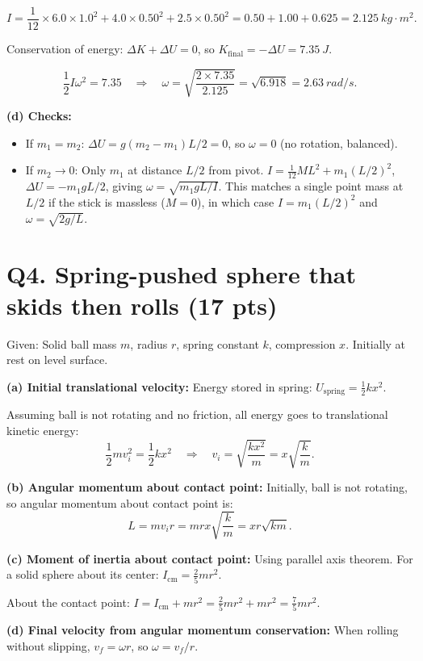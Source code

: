\documentclass[11pt]{article}
\newcommand{\ans}[1]{\boxed{\displaystyle #1}}
\begin{document}
\[ I = \frac{1}{12} \times 6.0 \times 1.0^2 + 4.0 \times 0.50^2 + 2.5 \times 0.50^2 = 0.50 + 1.00 + 0.625 = \SI{2.125}{kg\cdot m^2}. \]

Conservation of energy: $\Delta K + \Delta U = 0$, so $K_{\text{final}} = -\Delta U = \SI{7.35}{J}$.

\[ \frac{1}{2}I\omega^2 = 7.35 \quad\Rightarrow\quad \omega = \sqrt{\frac{2 \times 7.35}{2.125}} = \sqrt{6.918} = \ans{\SI{2.63}{rad/s}}. \]

\textbf{(d) Checks:}
\begin{itemize}
  \item If $m_1 = m_2$: $\Delta U = g(m_2 - m_1)L/2 = 0$, so $\omega = 0$ (no rotation, balanced).
  \item If $m_2 \to 0$: Only $m_1$ at distance $L/2$ from pivot. $I = \frac{1}{12}ML^2 + m_1(L/2)^2$, $\Delta U = -m_1 g L/2$, giving $\omega = \sqrt{m_1 g L / I}$. This matches a single point mass at $L/2$ if the stick is massless ($M = 0$), in which case $I = m_1(L/2)^2$ and $\omega = \sqrt{2g/L}$.
\end{itemize}

\section*{Q4. Spring-pushed sphere that skids then rolls (17 pts)}
Given: Solid ball mass $m$, radius $r$, spring constant $k$, compression $x$. Initially at rest on level surface.

\textbf{(a) Initial translational velocity:} Energy stored in spring: $U_{\text{spring}} = \frac{1}{2}kx^2$.

Assuming ball is not rotating and no friction, all energy goes to translational kinetic energy:
\[ \frac{1}{2}mv_i^2 = \frac{1}{2}kx^2 \quad\Rightarrow\quad v_i = \ans{\sqrt{\frac{kx^2}{m}} = x\sqrt{\frac{k}{m}}}. \]

\textbf{(b) Angular momentum about contact point:} Initially, ball is not rotating, so angular momentum about contact point is:
\[ L = mv_i r = \ans{mr x\sqrt{\frac{k}{m}} = xr\sqrt{km}}. \]

\textbf{(c) Moment of inertia about contact point:} Using parallel axis theorem. For a solid sphere about its center: $I_{\text{cm}} = \frac{2}{5}mr^2$.

About the contact point: $I = I_{\text{cm}} + mr^2 = \frac{2}{5}mr^2 + mr^2 = \ans{\frac{7}{5}mr^2}$.

\textbf{(d) Final velocity from angular momentum conservation:} When rolling without slipping, $v_f = \omega r$, so $\omega = v_f/r$.
\end{document}
